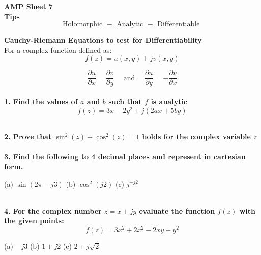 \documentclass{article}
\author{Alex Hiller}
\title{}
\newcommand{\question}[1]{\textbf{#1} \\}   %
\begin{document}

\textbf{AMP Sheet 7} \\

\textbf{Tips} \\
$$
\text{Holomorphic } \equiv \text{ Analytic } \equiv \text{ Differentiable }
$$

\textbf{Cauchy-Riemann Equations to test for Differentiability} \\ For a complex function defined as:
$$
f(z) = u(x,y) + j v(x,y)
$$

$$
\frac{\partial u}{\partial x} = \frac{\partial v}{\partial y} 
\quad \text{ and } \quad
\frac{\partial u}{\partial y} = - \frac{\partial v}{\partial x}
$$ \\



\question{1. Find the values of $a$ and $b$ such that $f$ is analytic}
$$
f(z) = 3x-2y^2 + j(2ax + 5by)
$$ 

\question{\\2. Prove that $\sin^2(z) + \cos^2(z) = 1$ holds for the complex variable $z$} \\

\question{3. Find the following to 4 decimal places and represent in cartesian form.} 

\begin{centering}
(a) $\sin(2\pi - j3)$ \qquad
(b) $\cos^2(j2) $ \qquad
(c) $j^{-j2}$ 

\end{centering} 

\question{\\4. For the complex number $z = x+jy$ evaluate the function $f(z)$ with the given points:}
$$
f(z) = 3x^2 + 2x^2 - 2xy +y^2
$$


\begin{centering}
(a) $-j3$ \qquad
(b) $1+j2 $ \qquad
(c) $2+j\sqrt2$ 

\end{centering} 
\end{document}
